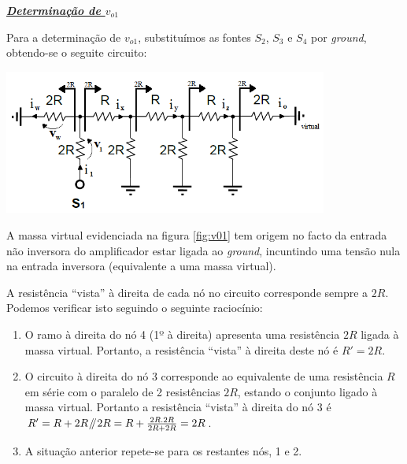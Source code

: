 \documentclass[a4paper,11pt]{report}
\newcommand{\parallelsum}{\mathbin{\!/\mkern-5mu/\!}} %
\begin{document}
\large\underline{{\textit{\textbf{Determinação de $v_{o1}$}}}}\\
\par

Para a determinação de $v_{o1}$, substituímos as fontes $S_2$, $S_3$ e $S_4$ por \textit{ground}, obtendo-se o seguite circuito:

\begin{center}
     \includegraphics[angle=0,width=0.8\textwidth]{v01.png}
     \label{fig:v01}
     \end{center}

A massa virtual evidenciada na figura \ref{fig:v01} tem origem no facto da entrada não inversora do amplificador estar ligada ao \textit{ground}, incuntindo uma tensão nula na entrada inversora (equivalente a uma massa virtual).

A resistência ``vista'' à direita de cada nó no circuito corresponde sempre a $2R$. Podemos verificar isto seguindo o seguinte raciocínio:

\begin{enumerate}

\item O ramo à direita do nó 4 (1º à direita) apresenta uma resistência $2R$ ligada à massa virtual. Portanto, a resistência ``vista'' à direita deste nó é $R'=2R$.

\item O circuito à direita do nó 3 corresponde ao equivalente de uma resistência $R$ em série com o paralelo de 2 resistências $2R$, estando o conjunto ligado à massa virtual. Portanto a resistência ``vista'' à direita do nó 3 é $R'=R+2R\parallelsum 2R=R+\frac{2R.2R}{2R+2R}=2R$.

\item A situação anterior repete-se para os restantes nós, 1 e 2.

\end{enumerate}
\end{document}
